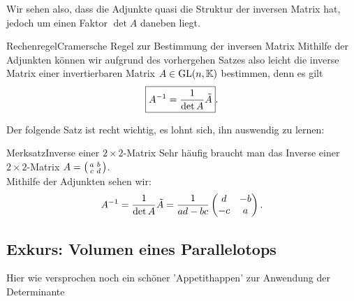 Wir sehen also, dass die Adjunkte quasi die Struktur der inversen Matrix hat, jedoch um einen Faktor $\det A$ daneben liegt.
\begin{Satz}
{Rechenregel}{Cramersche Regel zur Bestimmung der inversen Matrix}
Mithilfe der Adjunkten können wir aufgrund des vorhergehen Satzes also leicht die inverse Matrix einer invertierbaren Matrix $A\in\text{GL}(n,\mathbb{K})$ bestimmen, denn es gilt
\begin{equation}
    \boxed{A^{-1}=\frac{1}{\det A}\Tilde{A}}.
\end{equation}
\end{Satz}
Der folgende Satz ist recht wichtig, es lohnt sich, ihn auswendig zu lernen:
\begin{Satz}
{Merksatz}{Inverse einer $2\times2$-Matrix}
Sehr häufig braucht man das Inverse einer $2\times2$-Matrix $A=\left(\begin{smallmatrix}a&b\\c&d\end{smallmatrix}\right)$.\\
Mithilfe der Adjunkten sehen wir:
\begin{equation}
    \label{eq:01InverseZweiKreuzZwei}A^{-1}=\frac{1}{\det A}\Tilde{A}=\frac{1}{ad-bc}\begin{pmatrix}d&-b\\-c&a\end{pmatrix}.
\end{equation}
\end{Satz}





\subsection{Exkurs: Volumen eines Parallelotops}\label{ssec:14AnhangParallelotop}
Hier wie versprochen noch ein schöner 'Appetithappen' zur Anwendung der Determinante

